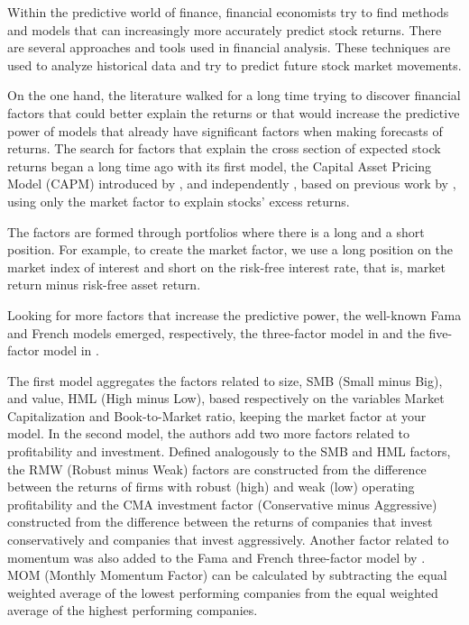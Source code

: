 Within the predictive world of finance, financial economists try to find methods and models that can increasingly more accurately predict stock returns. There are several approaches and tools used in financial analysis. These techniques are used to analyze historical data and try to predict future stock market movements.

On the one hand, the literature walked for a long time trying to discover financial factors that could better explain the returns or that would increase the predictive power of models that already have significant factors when making forecasts of returns. The search for factors that explain the cross section of expected stock returns began a long time ago with its first model, the Capital Asset Pricing Model (CAPM) introduced by ,  and  independently , based on previous work by , using only the market factor to explain stocks' excess returns.

The factors are formed through portfolios where there is a long and a short position. For example, to create the market factor, we use a long position on the market index of interest and short on the risk-free interest rate, that is, market return minus risk-free asset return.

Looking for more factors that increase the predictive power, the well-known Fama and French models emerged, respectively, the three-factor model in  and the five-factor model in .

The first model aggregates the factors related to size, SMB (Small minus Big), and value, HML (High minus Low), based respectively on the variables Market Capitalization and Book-to-Market ratio, keeping the market factor at your model. In the second model, the authors add two more factors related to profitability and investment. Defined analogously to the SMB and HML factors, the RMW (Robust minus Weak) factors are constructed from the difference between the returns of firms with robust (high) and weak (low) operating profitability and the CMA investment factor (Conservative minus Aggressive) constructed from the difference between the returns of companies that invest conservatively and companies that invest aggressively. Another factor related to momentum was also added to the Fama and French three-factor model by . MOM (Monthly Momentum Factor) can be calculated by subtracting the equal weighted average of the lowest performing companies from the equal weighted average of the highest performing companies.

